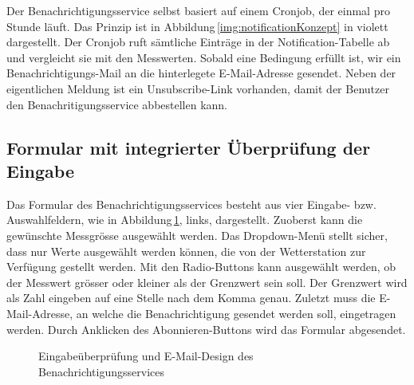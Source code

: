 Der Benachrichtigungsservice selbst basiert auf einem Cronjob, der einmal pro Stunde läuft. Das Prinzip ist in Abbildung\,\ref{img:notificationKonzept} in violett dargestellt. Der Cronjob ruft sämtliche Einträge in der Notification-Tabelle ab und vergleicht sie mit den Messwerten. Sobald eine Bedingung erfüllt ist, wir ein Benachrichtigungs-Mail an die hinterlegete E-Mail-Adresse gesendet. Neben der eigentlichen Meldung ist ein Unsubscribe-Link vorhanden, damit der Benutzer den Benachritigungsservice abbestellen kann.

\subsection{Formular mit integrierter Überprüfung der Eingabe}
Das Formular des Benachrichtigungsservices besteht aus vier Eingabe- bzw. Auswahlfeldern, wie in Abbildung\,\ref{img:notificationFE}, links, dargestellt. Zuoberst kann die gewünschte Messgrösse ausgewählt werden. Das Dropdown-Menü stellt sicher, dass nur Werte ausgewählt werden können, die von der Wetterstation zur Verfügung gestellt werden. Mit den Radio-Buttons kann ausgewählt werden, ob der Messwert grösser oder kleiner als der Grenzwert sein soll. Der Grenzwert wird als Zahl eingeben auf eine Stelle nach dem Komma genau. Zuletzt muss die E-Mail-Adresse, an welche die Benachrichtigung gesendet werden soll, eingetragen werden. Durch Anklicken des Abonnieren-Buttons wird das Formular abgesendet.

\begin{figure}[htbp!]
	\centering
	\caption{Eingabeüberprüfung und E-Mail-Design des Benachrichtigungsservices}
	\label{img:notificationFE}
\end{figure}

